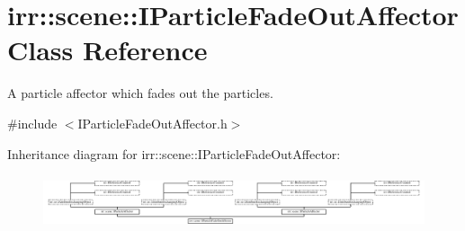 \hypertarget{classirr_1_1scene_1_1IParticleFadeOutAffector}{}\section{irr\+:\+:scene\+:\+:I\+Particle\+Fade\+Out\+Affector Class Reference}
\label{classirr_1_1scene_1_1IParticleFadeOutAffector}


A particle affector which fades out the particles.  




{\ttfamily \#include $<$I\+Particle\+Fade\+Out\+Affector.\+h$>$}

Inheritance diagram for irr\+:\+:scene\+:\+:I\+Particle\+Fade\+Out\+Affector\+:\begin{figure}[H]
\begin{center}
\leavevmode
\includegraphics[height=1.590909cm]{classirr_1_1scene_1_1IParticleFadeOutAffector}
\end{center}
\end{figure}
